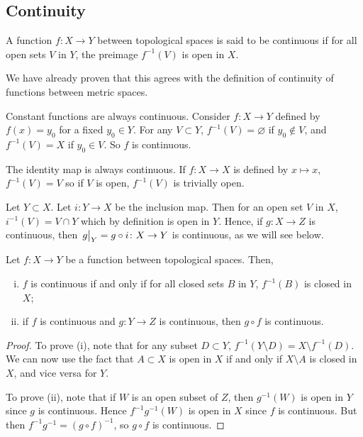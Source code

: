 \subsection{Continuity}
\begin{definition}
	A function \( f \colon X \to Y \) between topological spaces is said to be continuous if for all open sets \( V \) in \( Y \), the preimage \( f^{-1}(V) \) is open in \( X \).
\end{definition}
\begin{remark}
	We have already proven that this agrees with the definition of continuity of functions between metric spaces.
\end{remark}
\begin{example}
	Constant functions are always continuous.
	Consider \( f \colon X \to Y \) defined by \( f(x) = y_0 \) for a fixed \( y_0 \in Y \).
	For any \( V \subset Y \), \( f^{-1}(V) = \varnothing \) if \( y_0 \not\in V \), and \( f^{-1}(V) = X \) if \( y_0 \in V \).
	So \( f \) is continuous.
\end{example}
\begin{example}
	The identity map is always continuous.
	If \( f \colon X \to X \) is defined by \( x \mapsto x \), \( f^{-1}(V) = V \) so if \( V \) is open, \( f^{-1}(V) \) is trivially open.
\end{example}
\begin{example}
	Let \( Y \subset X \).
	Let \( i \colon Y \to X \) be the inclusion map.
	Then for an open set \( V \) in \( X \), \( i^{-1}(V) = V \cap Y \) which by definition is open in \( Y \).
	Hence, if \( g \colon X \to Z \) is continuous, then \( \eval{g}_Y = g \circ i \colon X \to Y \) is continuous, as we will see below.
\end{example}
\begin{proposition}
	Let \( f \colon X \to Y \) be a function between topological spaces.
	Then,
	\begin{enumerate}[(i)]
		\item \( f \) is continuous if and only if for all closed sets \( B \) in \( Y \), \( f^{-1}(B) \) is closed in \( X \);
		\item if \( f \) is continuous and \( g \colon Y \to Z \) is continuous, then \( g \circ f \) is continuous.
	\end{enumerate}
\end{proposition}
\begin{proof}
	To prove (i), note that for any subset \( D \subset Y \), \( f^{-1}(Y \setminus D) = X \setminus f^{-1}(D) \).
	We can now use the fact that \( A \subset X \) is open in \( X \) if and only if \( X \setminus A \) is closed in \( X \), and vice versa for \( Y \).

	To prove (ii), note that if \( W \) is an open subset of \( Z \), then \( g^{-1}(W) \) is open in \( Y \) since \( g \) is continuous.
	Hence \( f^{-1}g^{-1}(W) \) is open in \( X \) since \( f \) is continuous.
	But then \( f^{-1}g^{-1} = (g \circ f)^{-1} \), so \( g \circ f \) is continuous.
\end{proof}
